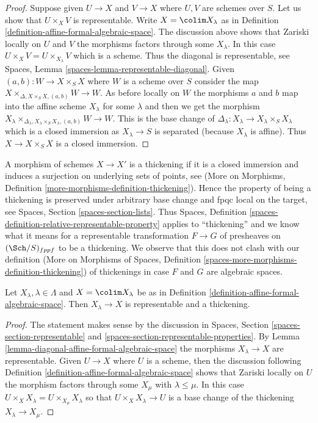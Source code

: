 \begin{proof}
Suppose given $U \to X$ and $V \to X$ where $U, V$ are schemes over $S$.
Let us show that $U \times_X V$ is representable. Write $X = \colim X_\lambda$
as in Definition \ref{definition-affine-formal-algebraic-space}.
The discussion above shows that Zariski locally on $U$ and $V$ the morphisms
factors through some $X_\lambda$. In this case
$U \times_X V = U \times_{X_\lambda} V$ which is a scheme.
Thus the diagonal is representable, see
Spaces, Lemma \ref{spaces-lemma-representable-diagonal}.
Given $(a, b) : W \to X \times_S X$ where $W$ is a scheme over $S$
consider the map $X \times_{\Delta, X \times_S X, (a, b)} W \to W$.
As before locally on $W$ the morphisms $a$ and $b$ map into
the affine scheme $X_\lambda$ for some $\lambda$ and then
we get the morphism
$X_\lambda
\times_{\Delta_\lambda, X_\lambda \times_S X_\lambda, (a, b)} W \to W$.
This is the base change of
$\Delta_\lambda : X_\lambda \to X_\lambda \times_S X_\lambda$
which is a closed immersion as $X_\lambda \to S$ is separated
(because $X_\lambda$ is affine).
Thus $X \to X \times_S X$ is a closed immersion.
\end{proof}

\noindent
A morphism of schemes $X \to X'$ is a thickening if it is a closed immersion
and induces a surjection on underlying sets of points, see
(More on Morphisms, Definition
\ref{more-morphisms-definition-thickening}).
Hence the property of being a thickening is preserved under arbitrary
base change and fpqc local on the target, see
Spaces, Section \ref{spaces-section-lists}.
Thus Spaces, Definition \ref{spaces-definition-relative-representable-property}
applies to ``thickening'' and we know what it means for a
representable transformation $F \to G$ of
presheaves on $(\Sch/S)_{fppf}$ to be a thickening.
We observe that this does not clash with our definition
(More on Morphisms of Spaces, Definition
\ref{spaces-more-morphisms-definition-thickening})
of thickenings in case $F$ and $G$ are algebraic spaces.

\begin{lemma}
\label{lemma-covering-by-thickenings}
Let $X_\lambda, \lambda \in \Lambda$ and $X = \colim X_\lambda$
be as in Definition \ref{definition-affine-formal-algebraic-space}.
Then $X_\lambda \to X$ is representable and a thickening.
\end{lemma}

\begin{proof}
The statement makes sense by the discussion in
Spaces, Section \ref{spaces-section-representable} and
\ref{spaces-section-representable-properties}.
By Lemma \ref{lemma-diagonal-affine-formal-algebraic-space}
the morphisms $X_\lambda \to X$ are representable.
Given $U \to X$ where $U$ is a scheme,
then the discussion following
Definition \ref{definition-affine-formal-algebraic-space}
shows that Zariski locally on $U$ the
morphism factors through some $X_\mu$ with $\lambda \leq \mu$.
In this case $U \times_X X_\lambda = U \times_{X_\mu} X_\lambda$
so that $U \times_X X_\lambda \to U$ is a base change of
the thickening $X_\lambda \to X_\mu$.
\end{proof}

